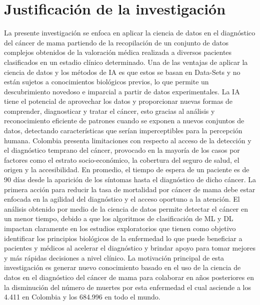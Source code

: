 \section{Justificación de la investigación}
La presente investigación se enfoca en aplicar la ciencia de datos en el diagnóstico del cáncer de mama partiendo de la recopilación de un conjunto de datos complejos obtenidos de la valoración médica realizada a diversos pacientes clasificados en un estadio clínico determinado. Una de las ventajas de aplicar la ciencia de datos y los métodos de IA es que estos se basan en Data-Sets y no están sujetos a conocimientos biológicos previos, lo que permite un descubrimiento novedoso e imparcial a partir de datos experimentales\cite{Troyanskaya2020}. La IA tiene el potencial de aprovechar los datos y proporcionar nuevas formas de comprender, diagnosticar y tratar el cáncer, esto gracias al análisis y reconocimiento eficiente de patrones cuando se exponen a nuevos conjuntos de datos, detectando características que serían imperceptibles para la percepción humana\cite{Turin2020}. 
Colombia presenta limitaciones con respecto al acceso de la detección y el diagnóstico temprano del cáncer, provocado en la mayoría de los casos por factores como el estrato socio-económico, la cobertura del seguro de salud, el origen y la accesibilidad. En promedio, el tiempo de espera de un paciente es de 90 días desde la aparición de los síntomas hasta el diagnóstico de dicho cáncer. La primera acción para reducir la tasa de mortalidad por cáncer de mama debe estar enfocada en la agilidad del diagnóstico y el acceso oportuno a la atención\cite{Duarte2021}. El análisis obtenido por medio de la ciencia de datos permite detectar el cáncer en un menor tiempo, debido a que los algoritmos de clasificación de ML y DL impactan claramente en los estudios exploratorios que tienen como objetivo identificar los principios biológicos de la enfermedad lo que puede beneficiar a pacientes y médicos al acelerar el diagnóstico y brindar apoyo para tomar mejores y más rápidas decisiones a nivel clínico\cite{Turin2020}. 
La motivación principal de esta investigación es generar nuevo conocimiento basado en el uso de la ciencia de datos en el diagnóstico del cáncer de mama para colaborar en años posteriores en la disminución del número de muertes por esta enfermedad el cual asciende a los 4.411 en Colombia\cite{InternationalAgencyforResearchonCancer2020} y los 684.996 en todo el mundo\cite{InternationalAgencyGlobal2020}.

\newpage
